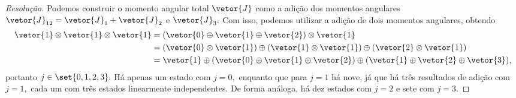 \begin{proof}[Resolução]
    Podemos construir o momento angular total \(\vetor{J}\) como a adição dos momentos angulares \(\vetor{J}_{12} = \vetor{J}_1 + \vetor{J}_2\) e \(\vetor{J}_3.\) Com isso, podemos utilizar a adição de dois momentos angulares, obtendo
    \begin{align*}
        \vetor{1} \otimes \vetor{1} \otimes \vetor{1} &= (\vetor{0} \oplus \vetor{1} \oplus \vetor{2}) \otimes \vetor{1}\\
                                                      &= (\vetor{0} \otimes \vetor{1}) \oplus (\vetor{1} \otimes \vetor{1}) \oplus (\vetor{2} \otimes \vetor{1})\\
                                                      &= \vetor{1} \oplus (\vetor{0} \oplus \vetor{1} \oplus \vetor{2}) \oplus (\vetor{1} \oplus \vetor{2} \oplus \vetor{3}),
    \end{align*}
    portanto \(j \in \set{0,1,2,3}.\) Há apenas um estado com \(j = 0,\) enquanto que para \(j = 1\) há nove, já que há três resultados de adição com \(j = 1,\) cada um com três estados linearmente independentes. De forma análoga, há dez estados com \(j = 2\) e sete com \(j = 3.\)


\end{proof}
